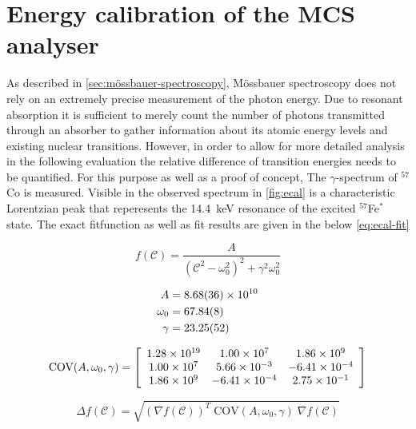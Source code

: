 
\section{Energy calibration of the MCS analyser}
\label{sec:ecal}

As described in \autoref{sec:mössbauer-spectroscopy}, Mössbauer spectroscopy does not
rely on an extremely precise measurement of the photon energy. Due to resonant
absorption it is sufficient to merely count the number of photons transmitted through
an absorber to gather information about its atomic energy levels and existing nuclear
transitions. However, in order to allow for more detailed analysis in the following
evaluation the relative difference of transition energies needs to be quantified.
For this purpose as well as a proof of concept, The $\gamma$-spectrum of $^{57}$Co is
measured. Visible in the observed spectrum in \autoref{fig:ecal} is a characteristic
Lorentzian peak that reperesents the \SI{14.4}{\kilo\electronvolt} resonance of the 
excited $^{57}$Fe$^{*}$ state. The exact fitfunction as well as fit results are given
in the below \autoref{eq:ecal-fit}

\begin{equation}
\label{eq:ecal-fit}
f(\mathcal{C}) = \frac{A}{(\mathcal{C}^2-\omega_0^2)^2 + \gamma^2\omega_0^2}
\end{equation}

\begin{align*}
	A &= \SI{8.68\pm 0.36e+10}{} \\
	\omega_0 &= \SI{67.84\pm 0.08}{} \\
	\gamma &= \SI{23.25\pm 0.52}{}
\end{align*}

\begin{equation*}
\text{COV}(A,\omega_0,\gamma) =
\left[
\begin{array}{c c c}
	1.28\times10^{19} & 1.00\times10^{7} & 1.86\times10^{9} \\
	1.00\times10^{7} & 5.66\times10^{-3} & -6.41\times10^{-4} \\
	1.86\times10^{9} & -6.41\times10^{-4} & 2.75\times10^{-1}
\end{array}
\right]
\end{equation*}

\begin{equation*}
	\Delta f(\mathcal{C}) = \sqrt{ (\nabla f(\mathcal{C}))^T\;\text{COV}(A,\omega_0,\gamma)\;\nabla f(\mathcal{C})}
\end{equation*}

